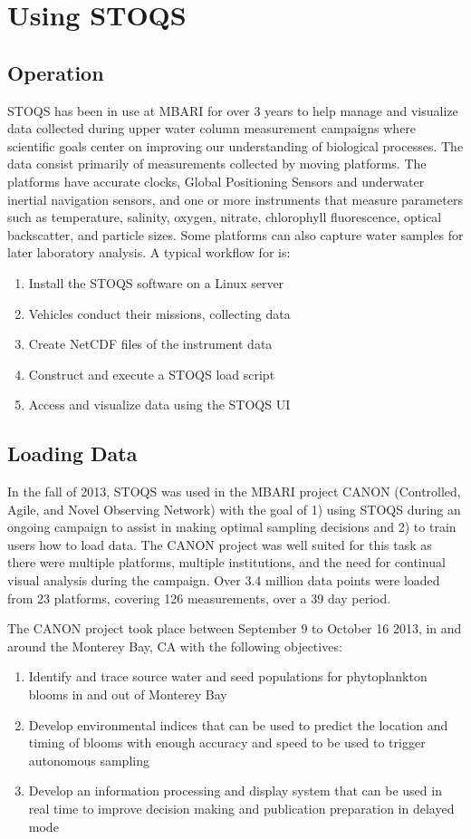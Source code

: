 \documentclass[conference]{IEEEtran}
\begin{document}
\section{Using STOQS}

\subsection{Operation}

STOQS has been in use at MBARI for over 3 years to help manage and visualize data collected during upper water column measurement campaigns where scientific goals center on improving our understanding of biological processes. The data consist primarily of measurements collected by moving platforms. The platforms have accurate clocks, Global Positioning Sensors and underwater inertial navigation sensors, and one or more instruments that measure parameters such as temperature, salinity, oxygen, nitrate, chlorophyll fluorescence, optical backscatter, and particle sizes. Some platforms can also capture water samples for later laboratory analysis. A typical workflow for is:
\begin{enumerate}
\item Install the STOQS software on a Linux server
\item Vehicles conduct their missions, collecting data
\item Create NetCDF files of the instrument data
\item Construct and execute a STOQS load script
\item Access and visualize data using the STOQS UI
\end{enumerate}


\subsection{Loading Data}

In the fall of 2013, STOQS was used in the MBARI project CANON (Controlled, Agile, and Novel Observing Network) with the goal of 1) using STOQS during an ongoing campaign to assist in making optimal sampling decisions and 2) to train users how to load data.  The CANON project was well suited for this task as there were multiple platforms, multiple institutions, and the need for continual visual analysis during the campaign.  Over 3.4 million data points were loaded from 23 platforms, covering 126 measurements, over a 39 day period. 

The CANON project took place between September 9 to October 16 2013, in and around the Monterey Bay, CA with the following objectives: 
\begin{enumerate}
\item Identify and trace source water and seed populations for phytoplankton blooms in and out of Monterey Bay
\item Develop environmental indices that can be used to predict the location and timing of blooms with enough accuracy and speed to be used to trigger autonomous sampling
\item Develop an information processing and display system that can be used in real time to improve decision making and publication preparation in delayed mode
\end{enumerate}
\end{document}
